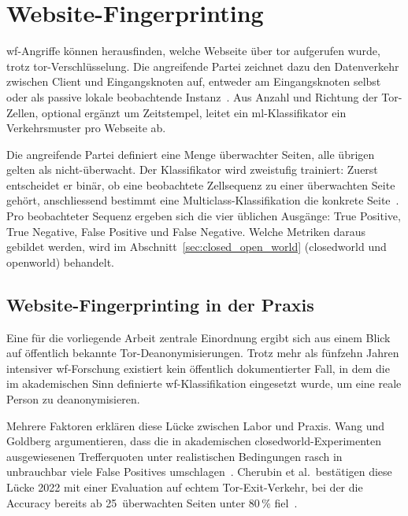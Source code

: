 \section{Website-Fingerprinting}
\label{sec:website_fingerprinting}

\gls{wf}-Angriffe können herausfinden, welche Webseite über \gls{tor} aufgerufen wurde, trotz \gls{tor}-Verschlüsselung.
Die angreifende Partei zeichnet dazu den Datenverkehr zwischen Client und Eingangsknoten auf, entweder am Eingangsknoten selbst~\cite{jansen2023data} oder als passive lokale beobachtende Instanz~\cite{wang2016realistically}.
Aus Anzahl und Richtung der Tor-Zellen, optional ergänzt um Zeitstempel, leitet ein \gls{ml}-Klassifikator ein Verkehrsmuster pro Webseite ab.

Die angreifende Partei definiert eine Menge überwachter Seiten, alle übrigen gelten als nicht-überwacht.
Der Klassifikator wird zweistufig trainiert: Zuerst entscheidet er binär, ob eine beobachtete Zellsequenz zu einer überwachten Seite gehört, anschliessend bestimmt eine Multiclass-Klassifikation die konkrete Seite~\cite{jansen2023data}.
Pro beobachteter Sequenz ergeben sich die vier üblichen Ausgänge: True Positive, True Negative, False Positive und False Negative.
Welche Metriken daraus gebildet werden, wird im Abschnitt~\ref{sec:closed_open_world} (\gls{closedworld} und \gls{openworld}) behandelt.


\subsection{Website-Fingerprinting in der Praxis}
\label{sec:wf_in_der_praxis}

Eine für die vorliegende Arbeit zentrale Einordnung ergibt sich aus einem Blick auf öffentlich bekannte Tor-Deanonymisierungen.
Trotz mehr als fünfzehn Jahren intensiver \gls{wf}-Forschung existiert kein öffentlich dokumentierter Fall, in dem die im akademischen Sinn definierte \gls{wf}-Klassifikation eingesetzt wurde, um eine reale Person zu deanonymisieren.

Mehrere Faktoren erklären diese Lücke zwischen Labor und Praxis.
Wang und Goldberg argumentieren, dass die in akademischen \gls{closedworld}-Experimenten ausgewiesenen Trefferquoten unter realistischen Bedingungen rasch in unbrauchbar viele False Positives umschlagen~\cite{wang2016realistically}.
Cherubin et al.\ bestätigen diese Lücke 2022 mit einer Evaluation auf echtem Tor-Exit-Verkehr, bei der die Accuracy bereits ab 25~überwachten Seiten unter 80\,\% fiel~\cite{cherubin2022online}.

